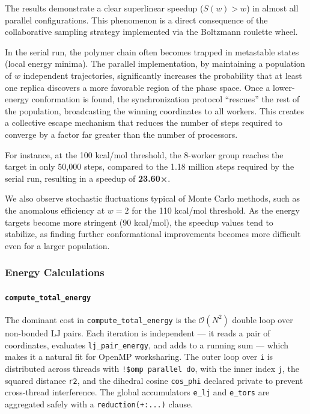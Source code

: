 \documentclass[
]{article}
\begin{document}
The results demonstrate a clear superlinear speedup (\(S(w) > w\)) in
almost all parallel configurations. This phenomenon is a direct
consequence of the collaborative sampling strategy implemented via the
Boltzmann roulette wheel.

In the serial run, the polymer chain often becomes trapped in metastable
states (local energy minima). The parallel implementation, by
maintaining a population of \(w\) independent trajectories,
significantly increases the probability that at least one replica
discovers a more favorable region of the phase space. Once a
lower-energy conformation is found, the synchronization protocol
``rescues'' the rest of the population, broadcasting the winning
coordinates to all workers. This creates a collective escape mechanism
that reduces the number of steps required to converge by a factor far
greater than the number of processors.

For instance, at the 100 kcal/mol threshold, the 8-worker group reaches
the target in only 50,000 steps, compared to the 1.18 million steps
required by the serial run, resulting in a speedup of \textbf{23.60×}.

We also observe stochastic fluctuations typical of Monte Carlo methods,
such as the anomalous efficiency at \(w=2\) for the 110 kcal/mol
threshold. As the energy targets become more stringent (90 kcal/mol),
the speedup values tend to stabilize, as finding further conformational
improvements becomes more difficult even for a larger population.

\subsubsection{Energy Calculations}\label{energy-calculations}

\paragraph{\texorpdfstring{\texttt{compute\_total\_energy}}{compute\_total\_energy}}\label{compute_total_energy}

The dominant cost in \texttt{compute\_total\_energy} is the
\(\mathcal{O}(N^2)\) double loop over non-bonded LJ pairs. Each
iteration is independent --- it reads a pair of coordinates, evaluates
\texttt{lj\_pair\_energy}, and adds to a running sum --- which makes it
a natural fit for OpenMP worksharing. The outer loop over \texttt{i} is
distributed across threads with \texttt{!\$omp\ parallel\ do}, with the
inner index \texttt{j}, the squared distance \texttt{r2}, and the
dihedral cosine \texttt{cos\_phi} declared private to prevent
cross-thread interference. The global accumulators \texttt{e\_lj} and
\texttt{e\_tors} are aggregated safely with a \texttt{reduction(+:...)}
clause.
\end{document}

